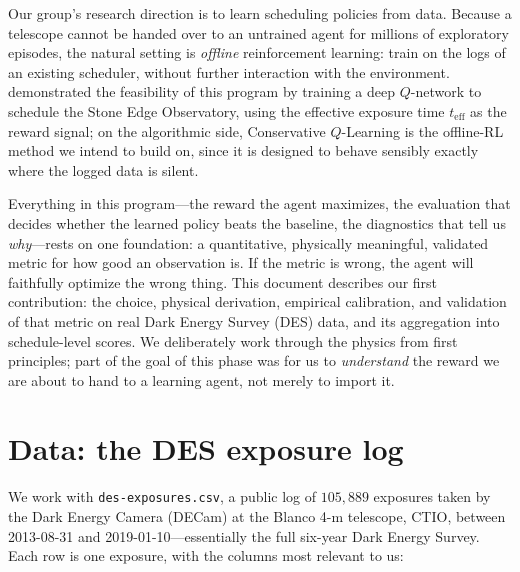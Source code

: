 \documentclass[11pt]{article}
\newcommand{\teff}{t_{\mathrm{eff}}}
\begin{document}
Our group's research direction is to learn scheduling policies from data. Because a
telescope cannot be handed over to an untrained agent for millions of exploratory
episodes, the natural setting is \emph{offline} reinforcement learning: train on the
logs of an existing scheduler, without further interaction with the environment.
\citet{terranova2023} demonstrated the feasibility of this program by training a deep
$Q$-network to schedule the Stone Edge Observatory, using the effective exposure time
$\teff$ as the reward signal; on the algorithmic side, Conservative $Q$-Learning
\citep[CQL;][]{kumar2020} is the offline-RL method we intend to build on, since it is
designed to behave sensibly exactly where the logged data is silent.

Everything in this program---the reward the agent maximizes, the evaluation that
decides whether the learned policy beats the baseline, the diagnostics that tell us
\emph{why}---rests on one foundation: a quantitative, physically meaningful,
validated metric for how good an observation is. If the metric is wrong, the agent
will faithfully optimize the wrong thing. This document describes our first
contribution: the choice, physical derivation, empirical calibration, and validation
of that metric on real Dark Energy Survey (DES) data, and its aggregation into
schedule-level scores. We deliberately work through the physics from first principles;
part of the goal of this phase was for us to \emph{understand} the reward we are about
to hand to a learning agent, not merely to import it.

\section{Data: the DES exposure log}
\label{sec:data}

We work with \texttt{des-exposures.csv}, a public log of $105{,}889$ exposures taken
by the Dark Energy Camera (DECam) at the Blanco 4-m telescope, CTIO, between
2013-08-31 and 2019-01-10---essentially the full six-year Dark Energy Survey. Each row
is one exposure, with the columns most relevant to us:
\end{document}
